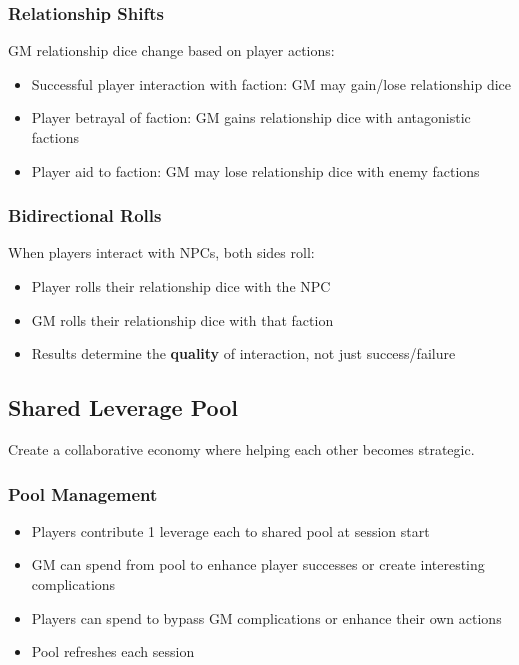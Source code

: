 \begin{description}
\subsubsection{Relationship Shifts}

GM relationship dice change based on player actions:
\begin{itemize}
\item Successful player interaction with faction: GM may gain/lose relationship dice
\item Player betrayal of faction: GM gains relationship dice with antagonistic factions
\item Player aid to faction: GM may lose relationship dice with enemy factions
\end{itemize}

\subsubsection{Bidirectional Rolls}

When players interact with NPCs, both sides roll:
\begin{itemize}
\item Player rolls their relationship dice with the NPC
\item GM rolls their relationship dice with that faction
\item Results determine the \textbf{quality} of interaction, not just success/failure
\end{itemize}

\subsection{Shared Leverage Pool}

Create a collaborative economy where helping each other becomes strategic.

\subsubsection{Pool Management}

\begin{itemize}
\item Players contribute 1 leverage each to shared pool at session start
\item GM can spend from pool to enhance player successes or create interesting complications
\item Players can spend to bypass GM complications or enhance their own actions
\item Pool refreshes each session
\end{itemize}


\end{description}
